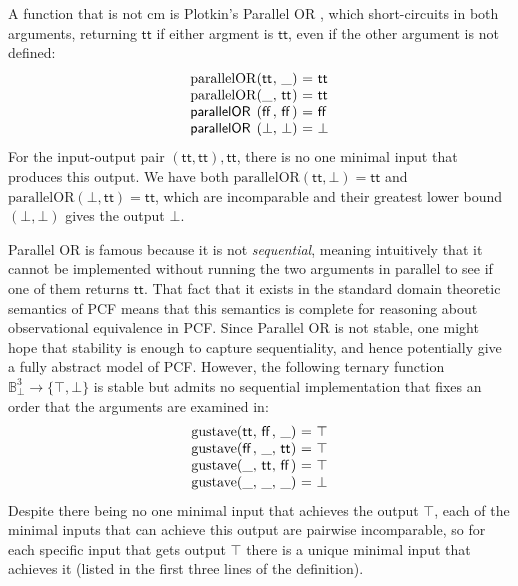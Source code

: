 \begin{example}
  \label{ex:parallel-or}
  A function that is not cm is Plotkin's Parallel OR \cite{lcf77},
  which short-circuits in both arguments, returning $\mathsf{tt}$ if
  either argment is $\mathsf{tt}$, even if the other argument is not
  defined:
  \begin{displaymath}
    \begin{array}{l@{(}l@{,~}l@{)~}c@{~}l}
      \mathrm{parallelOR}&\mathsf{tt}&\_&=&\mathsf{tt} \\
      \mathrm{parallelOR}&\_&\mathsf{tt}&=&\mathsf{tt} \\
      \mathsf{parallelOR}&\mathsf{ff}&\mathsf{ff}&=&\mathsf{ff} \\
      \mathsf{parallelOR}&\bot&\bot&=&\bot
    \end{array}
  \end{displaymath}
  For the input-output pair $(\mathsf{tt},\mathsf{tt}),\mathsf{tt}$,
  there is no one minimal input that produces this output. We have
  both $\mathrm{parallelOR}(\mathsf{tt},\bot) = \mathsf{tt}$ and
  $\mathrm{parallelOR}(\bot,\mathsf{tt}) = \mathsf{tt}$, which are
  incomparable and their greatest lower bound $(\bot,\bot)$ gives the
  output $\bot$.

  Parallel OR is famous because it is not \emph{sequential}, meaning
  intuitively that it cannot be implemented without running the two
  arguments in parallel to see if one of them returns
  $\mathsf{tt}$. That fact that it exists in the standard domain
  theoretic semantics of PCF means that this semantics is complete for
  reasoning about observational equivalence in PCF. Since Parallel OR
  is not stable, one might hope that stability is enough to capture
  sequentiality, and hence potentially give a fully abstract model of
  PCF. However, the following ternary function
  $\mathbb{B}_\bot^3 \to \{\top,\bot\}$ is stable but admits no
  sequential implementation that fixes an order that the arguments are
  examined in:
  \begin{displaymath}
    \begin{array}{l@{(}l@{,~}l@{,~}l@{)~}c@{~}l}
      \mathrm{gustave}&\mathsf{tt}&\mathsf{ff}&\_&=&\top \\
      \mathrm{gustave}&\mathsf{ff}&\_&\mathsf{tt}&=&\top \\
      \mathrm{gustave}&\_&\mathsf{tt}&\mathsf{ff}&=&\top \\
      \mathrm{gustave}&\_&\_&\_&=&\bot
    \end{array}
  \end{displaymath}
  Despite there being no one minimal input that achieves the output
  $\top$, each of the minimal inputs that can achieve this output are
  pairwise incomparable, so for each specific input that gets output
  $\top$ there is a unique minimal input that achieves it (listed in
  the first three lines of the definition).


\end{example}
